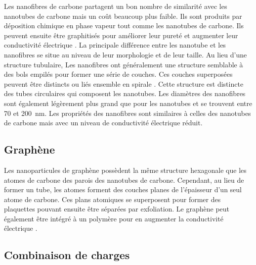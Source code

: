 Les nanofibres de carbone partagent un bon nombre de similarité avec les nanotubes de carbone mais un coût beaucoup plus faible. 
Ils sont produits par déposition chimique en phase vapeur tout comme les nanotubes de carbone. 
Ils peuvent ensuite être graphitisés pour améliorer leur pureté et augmenter leur conductivité électrique \cite{Al-Saleh2009c}. 
La principale différence entre les nanotube et les nanofibres se situe au niveau de leur morphologie et de leur taille. 
Au lieu d'une structure tubulaire, Les nanofibres ont généralement une structure semblable à des bols empilés pour former une série de couches. 
Ces couches superposées peuvent être distincts ou liés ensemble en spirale \cite{Al-Saleh2009c}. 
Cette structure est distincte des tubes circulaires qui composent les nanotubes. 
Les diamètres des nanofibres sont également légèrement plus grand que pour les nanotubes et se trouvent entre 70 et \SI{200}{\nano\metre}. 
Les propriétés des nanofibres sont similaires à celles des nanotubes de carbone mais avec un niveau de conductivité électrique réduit. 

\subsection{Graphène}

Les nanoparticules de graphène possèdent la même structure hexagonale que les atomes de carbone des parois des nanotubes de carbone. 
Cependant, au lieu de former un tube, les atomes forment des couches planes de l'épaisseur d'un seul atome de carbone. 
Ces plans atomiques se superposent pour former des plaquettes pouvant ensuite être séparées par exfoliation. 
Le graphène peut également être intégré à un polymère pour en augmenter la conductivité électrique \cite{Jin2013,Wu2012a,Dweiri2015}. 

\subsection{Combinaison de charges}

